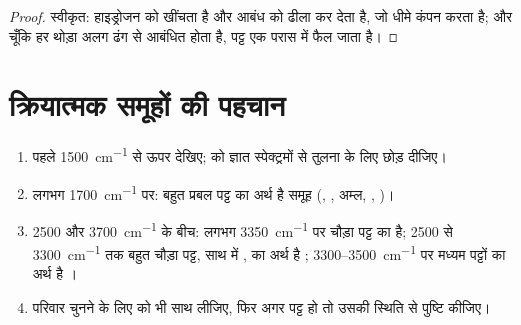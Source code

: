 \begin{proof}
स्वीकृत:  हाइड्रोजन  को खींचता है और
 आबंध को ढीला कर देता है, जो धीमे कंपन करता है; और चूँकि हर 
थोड़ा अलग ढंग से आबंधित होता है, पट्ट एक परास में फैल जाता है।
\end{proof}

\section{क्रियात्मक समूहों की पहचान}


\begin{method}[अवरक्त स्पेक्ट्रम पढ़ना]\label{met:g11:infrared:reading}
\begin{enumerate}
  \item पहले \qty{1500}{cm^{-1}} से ऊपर देखिए;  को
        ज्ञात स्पेक्ट्रमों से तुलना के लिए छोड़ दीजिए।
  \item लगभग \qty{1700}{cm^{-1}} पर: बहुत प्रबल पट्ट का अर्थ है 
        समूह (, , अम्ल, , )।
  \item 2500 और \qty{3700}{cm^{-1}} के बीच: लगभग
        \qty{3350}{cm^{-1}} पर चौड़ा पट्ट  का  है;
        2500 से \qty{3300}{cm^{-1}} तक बहुत चौड़ा पट्ट, साथ में , का अर्थ है
        ; 3300--\qty{3500}{cm^{-1}} पर मध्यम पट्टों का अर्थ है
        ।
  \item परिवार चुनने के लिए  को भी साथ लीजिए, फिर अगर
         पट्ट हो तो उसकी स्थिति से पुष्टि कीजिए।
\end{enumerate}
\end{method}

